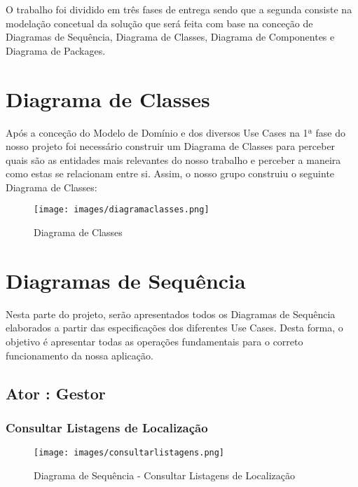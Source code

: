 \documentclass[11pt]{article}
\begin{document}
O trabalho foi dividido em três fases de entrega sendo que a segunda consiste na modelação concetual da solução que será feita com base na conceção de Diagramas de Sequência, Diagrama de Classes, Diagrama de Componentes e Diagrama de Packages.

\section{Diagrama de Classes}

Após a conceção do Modelo de Domínio e dos diversos Use Cases na 1ª fase do nosso projeto foi necessário construir um Diagrama de Classes para perceber quais são as entidades mais relevantes do nosso trabalho e perceber a maneira como estas se relacionam entre si. Assim, o nosso grupo construiu o seguinte Diagrama de Classes:

\begin{figure}[htb]
    \centering
    \texttt{[image: images/diagramaclasses.png]}
    \caption{Diagrama de Classes}
    \label{fig:my_label3}
\end{figure}

\clearpage

\section{Diagramas de Sequência}

Nesta parte do projeto, serão apresentados todos os Diagramas de Sequência elaborados a partir das especificações dos diferentes Use Cases. Desta forma, o objetivo é apresentar todas as operações fundamentais para o correto funcionamento da nossa aplicação.

\subsection{Ator : Gestor}

\subsubsection{Consultar Listagens de Localização}

\begin{figure}[htb]
    \centering
    \texttt{[image: images/consultarlistagens.png]}
    \caption{Diagrama de Sequência - Consultar Listagens de Localização}
    \label{fig:my_label1}
\end{figure}

\clearpage
\end{document}
